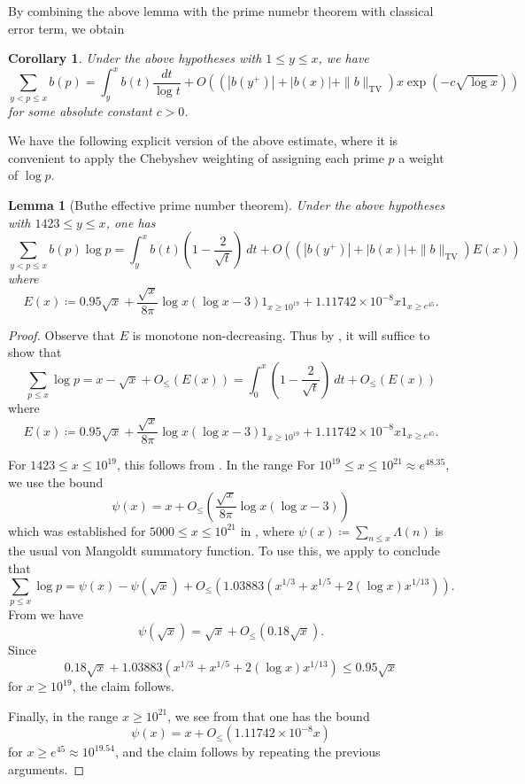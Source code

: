 \documentclass[12pt,a4paper,reqno]{amsart}
\numberwithin{equation}{section}
\theoremstyle{plain}
\newtheorem{lemma}[theorem]{Lemma}
\newtheorem{corollary}[theorem]{Corollary}
\theoremstyle{definition}
\begin{document}
By combining the above lemma with the prime numebr theorem with classical error term, we obtain

\begin{corollary}\label{pnt}  Under the above hypotheses with $1 \leq y \leq x$, we have
$$  \sum_{y < p \leq x} b(p) = \int_y^x b(t) \frac{dt}{\log t} + O\left((|b(y^+)| + |b(x)| + \|b\|_{\mathrm{TV}}) x \exp(-c\sqrt{\log x})\right)$$
for some absolute constant $c>0$.
\end{corollary}

We have the following explicit version of the above estimate, where it is convenient to apply the Chebyshev weighting of assigning each prime $p$ a weight of $\log p$.

\begin{lemma}[Buthe effective prime number theorem]\label{buthe}  Under the above hypotheses 
with $1423 \leq y \leq x$, one has
$$  \sum_{y < p \leq x} b(p) \log p = \int_y^x b(t) (1 - \frac{2}{\sqrt{t}}) \ dt
+ O\left((|b(y^+)| + |b(x)| + \|b\|_{\mathrm{TV}}) E(x) \right)$$
where
$$ E(x) \coloneqq 0.95 \sqrt{x} + \frac{\sqrt{x}}{8\pi} \log x(\log x - 3) 1_{x \geq 10^{19}} + 1.11742 \times 10^{-8} x 1_{x \geq e^{45}}.$$
\end{lemma}

\begin{proof} Observe that $E$ is monotone non-decreasing. Thus by , it will suffice to show that
$$ \sum_{p \leq x} \log p = x - \sqrt{x} + O_{\leq}(E(x))
  = \int_0^x (1-\frac{2}{\sqrt{t}})\ dt + O_{\leq}(E(x))$$
where
$$ E(x) \coloneqq 0.95 \sqrt{x} + \frac{\sqrt{x}}{8\pi} \log x(\log x - 3) 1_{x \geq 10^{19}} + 1.11742 \times 10^{-8} x 1_{x \geq e^{45}}.$$

For $1423 \leq x \leq 10^{19}$, this follows from \cite[Theorem 2]{buthe-2}.  In the range
For $10^{19} \leq x \leq 10^{21} \approx e^{48.35}$, we use the bound
  $$ \psi(x) = x + O_{\leq}(\frac{\sqrt{x}}{8\pi} \log x(\log x - 3))$$
which was established for $5000 \leq x \leq 10^{21}$ in \cite[(7.3)]{buthe}, where $\psi(x) \coloneqq \sum_{n \leq x} \Lambda(n)$ is the usual von Mangoldt summatory function.  To use this, we apply \cite[(6.10), (6.11)]{buthe} to conclude that
$$
\sum_{p \leq x} \log p = \psi(x) - \psi(\sqrt{x}) + O_{\leq}(1.03883 (x^{1/3} + x^{1/5} + 2 (\log x) x^{1/13})).$$
From \cite[Theorems 10,12]{rs} we have
$$ \psi(\sqrt{x}) = \sqrt{x} + O_{\leq}(0.18 \sqrt{x}).$$
Since
$$ 0.18 \sqrt{x} + 1.03883 (x^{1/3} + x^{1/5} + 2 (\log x) x^{1/13}) \leq 0.95 \sqrt{x}$$
for $x \geq 10^{19}$, the claim follows.

Finally, in the range $x \geq 10^{21}$, we see from \cite[Theorem 1, Table 1]{buthe} that one has the bound
$$ \psi(x) = x + O_{\leq}(1.11742 \times 10^{-8} x)$$
for $x \geq e^{45} \approx 10^{19.54}$, and the claim follows by repeating the previous arguments.
\end{proof}
    
\end{document}
